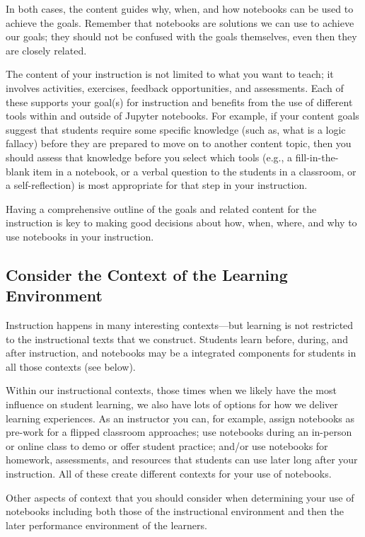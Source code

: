\documentclass[]{book}
\begin{document}
In both cases, the content guides why, when, and how notebooks can be
used to achieve the goals. Remember that notebooks are solutions we can
use to achieve our goals; they should not be confused with the goals
themselves, even then they are closely related.

The content of your instruction is not limited to what you want to
teach; it involves activities, exercises, feedback opportunities, and
assessments. Each of these supports your goal(s) for instruction and
benefits from the use of different tools within and outside of Jupyter
notebooks. For example, if your content goals suggest that students
require some specific knowledge (such as, what is a logic fallacy)
before they are prepared to move on to another content topic, then you
should assess that knowledge before you select which tools (e.g., a
fill-in-the-blank item in a notebook, or a verbal question to the
students in a classroom, or a self-reflection) is most appropriate for
that step in your instruction.

Having a comprehensive outline of the goals and related content for the
instruction is key to making good decisions about how, when, where, and
why to use notebooks in your instruction.

\subsection{Consider the Context of the Learning
Environment}\label{consider-the-context-of-the-learning-environment}

Instruction happens in many interesting contexts---but learning is not
restricted to the instructional texts that we construct. Students learn
before, during, and after instruction, and notebooks may be a integrated
components for students in all those contexts (see below).

Within our instructional contexts, those times when we likely have the
most influence on student learning, we also have lots of options for how
we deliver learning experiences. As an instructor you can, for example,
assign notebooks as pre-work for a flipped classroom approaches; use
notebooks during an in-person or online class to demo or offer student
practice; and/or use notebooks for homework, assessments, and resources
that students can use later long after your instruction. All of these
create different contexts for your use of notebooks.

Other aspects of context that you should consider when determining your
use of notebooks including both those of the instructional environment
and then the later performance environment of the learners.
\end{document}

